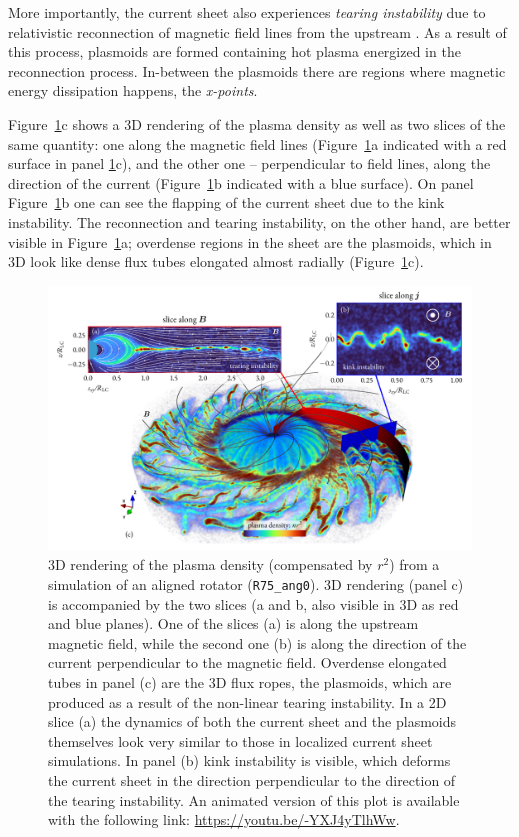 More importantly, the current sheet also experiences \emph{tearing instability} due to relativistic reconnection of magnetic field lines from the upstream \citep[see, e.g.,][]{PSAS18}. As a result of this process, plasmoids are formed containing hot plasma energized in the reconnection process. In-between the plasmoids there are regions where magnetic energy dissipation happens, the \emph{x-points}.

Figure~\ref{fig:psr-pulsar3d}c shows a 3D rendering of the plasma density as well as two slices of the same quantity: one along the magnetic field lines (Figure~\ref{fig:psr-pulsar3d}a indicated with a red surface in panel \ref{fig:psr-pulsar3d}c), and the other one -- perpendicular to field lines, along the direction of the current (Figure~\ref{fig:psr-pulsar3d}b indicated with a blue surface). On panel Figure~\ref{fig:psr-pulsar3d}b one can see the flapping of the current sheet due to the kink instability. The reconnection and tearing instability, on the other hand, are better visible in Figure~\ref{fig:psr-pulsar3d}a; overdense regions in the sheet are the plasmoids, which in 3D look like dense flux tubes elongated almost radially (Figure~\ref{fig:psr-pulsar3d}c). 

\begin{figure}[htb]
\centering
\includegraphics[width=\columnwidth,trim={10 10 10 5},clip]{figures/ch3-pulsar/fig3.pdf}
\caption{3D rendering of the plasma density (compensated by $r^2$) from a simulation of an aligned rotator (\texttt{R75\_ang0}). 3D rendering (panel c) is accompanied by the two slices (a and b, also visible in 3D as red and blue planes). One of the slices (a) is along the upstream magnetic field, while the second one (b) is along the direction of the current perpendicular to the magnetic field. Overdense elongated tubes in panel (c) are the 3D flux ropes, the plasmoids, which are produced as a result of the non-linear tearing instability. In a 2D slice (a) the dynamics of both the current sheet and the plasmoids themselves look very similar to those in localized current sheet simulations. In panel (b) kink instability is visible, which deforms the current sheet in the direction perpendicular to the direction of the tearing instability. An animated version of this plot is available with the following link: \url{https://youtu.be/-YXJ4yTlhWw}.}
\label{fig:psr-pulsar3d}
\end{figure}


